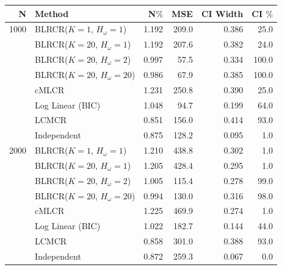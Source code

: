 \documentclass[
  12pt,
]{article}
\begin{document}
\begin{table}[H]
\centering
\begin{tabular}{||r l r r r r||} 
 \hline
N & Method & N$\%$ &MSE & CI Width & CI $\%$   \\ [0.5ex] 
 \hline\hline



 1000          & BLRCR($K=1$, $H_\omega=1$)  & 1.192   & 209.0   & 0.386   & 25.0 \\ 
               & BLRCR($K=20$, $H_\omega=1$)    & 1.192     & 207.6     & 0.382     & 24.0 \\ 
               & BLRCR($K=20$, $H_\omega=2$)    & 0.997     & 57.5     & 0.334     & 100.0 \\ 
               & BLRCR($K=20$, $H_\omega=20$)    & 0.986     & 67.9     & 0.385     & 100.0 \\ 
               & cMLCR       & 1.231       & 250.8      & 0.390      & 25.0 \\
               & Log Linear (BIC)  & 1.048      & 94.7     & 0.199     & 64.0 \\ 
               & LCMCR       & 0.851       & 156.0      & 0.414      & 93.0 \\ 
               & Independent & 0.875 & 128.2& 0.095& 1.0 \\ 

 \hline
 


 2000          & BLRCR($K=1$, $H_\omega=1$)  & 1.210   & 438.8   & 0.302   & 1.0 \\ 
               & BLRCR($K=20$, $H_\omega=1$)    & 1.205     & 428.4     & 0.295     & 1.0 \\
               & BLRCR($K=20$, $H_\omega=2$)    & 1.005     & 115.4     & 0.278     & 99.0 \\
               & BLRCR($K=20$, $H_\omega=20$)    & 0.994     & 130.0     & 0.316     & 98.0 \\ 
               & cMLCR       & 1.225       & 469.9      & 0.274      & 1.0 \\
               & Log Linear (BIC)  & 1.022      & 182.7     & 0.144     & 44.0 \\ 
               & LCMCR       & 0.858       & 301.0      & 0.388      & 93.0 \\ 
               & Independent & 0.872 & 259.3& 0.067& 0.0 \\ 

 \hline
 



\end{tabular}
\end{table}
\end{document}
